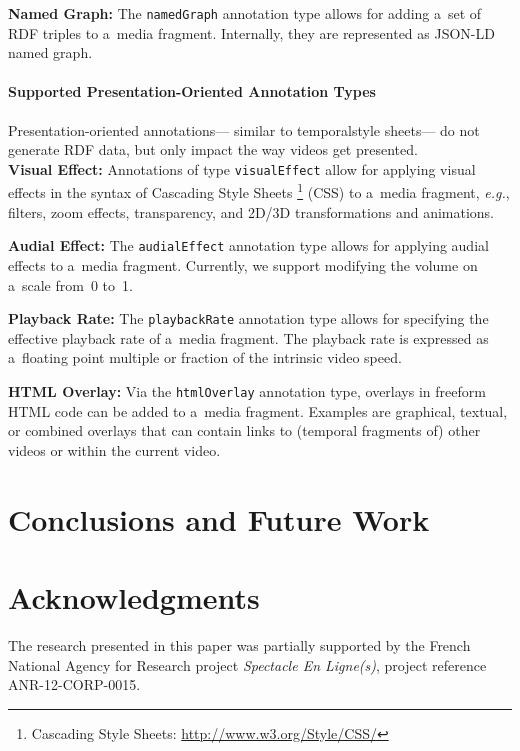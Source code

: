 \documentclass{sig-alternate}
\newcommand{\inlinelistingsize}{\fontsize{8pt}{11pt}}
\let\oldurl\url
\renewcommand{\url}[1]{\inlinelistingsize\oldurl{#1}}
\def\JSONLD{\mbox{JSON-LD}}
\begin{document}
\noindent \textbf{Named Graph:} The \texttt{namedGraph} annotation type
  allows for adding a~set of RDF triples
  to a~media fragment.
  Internally, they are represented as \JSONLD%
  ~\cite{sporny2013jsonld} named graph.

\paragraph{Supported Presentation-Oriented Annotation Types}

Presentation-oriented annotations---%
similar to temporal\linebreak style sheets---%
do not generate RDF data,
but only impact the way videos get presented.\\

\noindent \textbf{Visual Effect:} Annotations of
  type \texttt{visualEffect} allow for applying visual effects
  in the syntax of Cascading Style Sheets%
  \footnote{Cascading Style Sheets:
  \url{http://www.w3.org/Style/CSS/}} (CSS)
  to a~media fragment, \emph{e.g.},
  filters, zoom effects, transparency,
  and 2D/3D transformations and animations.

\noindent \textbf{Audial Effect:} The \texttt{audialEffect} annotation type
  allows for applying audial effects to a~media fragment.
  Currently, we support modifying the volume on a~scale
  from~0 to~1.

\noindent \textbf{Playback Rate:} The \texttt{playbackRate}
  annotation type allows for specifying the effective
  playback rate of a~media fragment.
  The playback rate is expressed as a~floating point
  multiple or fraction of the intrinsic video speed.

\noindent \textbf{HTML Overlay:} Via the \texttt{htmlOverlay}
  annotation type, overlays in
  freeform HTML code can be added to a~media fragment.
  Examples are graphical, textual, or combined overlays
  that can contain links to (temporal fragments of)
  other videos or within the current video.

\section{Conclusions and Future Work}

\section*{Acknowledgments}
\footnotesize
The research presented in this paper was partially supported
by the French National Agency for Research  project
\emph{Spectacle En Ligne(s)}, project reference
\mbox{ANR-12-CORP-0015}.

\normalsize


\end{document}
